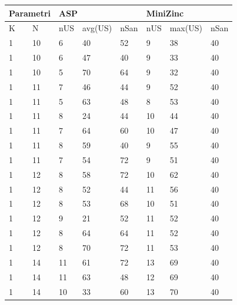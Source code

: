 \documentclass[12pt, italian, openany]{book}
\begin{document}
\begin{table}[]
\begin{tabular}{ll|lll|lll}
\multicolumn{2}{l|}{Parametri} & \multicolumn{3}{l|}{ASP} & \multicolumn{3}{l}{MiniZinc} \\ \hline
K             & N              & nUS    & avg(US)   & nSan     & nUS      & max(US)     & nSan     \\ \hline
1           & 10           & 6    & 40        & 52    & 9    & 38        & 40   \\
1           & 10           & 6    & 47        & 40    & 9    & 33        & 40   \\
1           & 10           & 5    & 70        & 64    & 9    & 32        & 40   \\
1           & 11           & 7    & 46        & 44    & 9    & 52        & 40   \\
1           & 11           & 5    & 63        & 48    & 8    & 53        & 40   \\
1           & 11           & 8    & 24        & 44    & 10   & 44        & 40   \\
1           & 11           & 7    & 64        & 60    & 10   & 47        & 40   \\
1           & 11           & 8    & 59        & 40    & 9    & 55        & 40   \\
1           & 11           & 7    & 54        & 72    & 9    & 51        & 40   \\
1           & 12           & 8    & 58        & 72    & 10   & 62        & 40   \\
1           & 12           & 8    & 52        & 44    & 11   & 56        & 40   \\
1           & 12           & 8    & 53        & 68    & 10   & 51        & 40   \\
1           & 12           & 9    & 21        & 52    & 11   & 52        & 40   \\
1           & 12           & 8    & 64        & 64    & 11   & 52        & 40   \\
1           & 12           & 8    & 70        & 72    & 11   & 53        & 40   \\
1           & 14           & 11   & 61        & 72    & 13   & 69        & 40   \\
1           & 14           & 11   & 63        & 48    & 12   & 69        & 40   \\
1           & 14           & 10   & 33        & 60    & 13   & 70        & 40   \\

\end{tabular}
\end{table}
\end{document}
